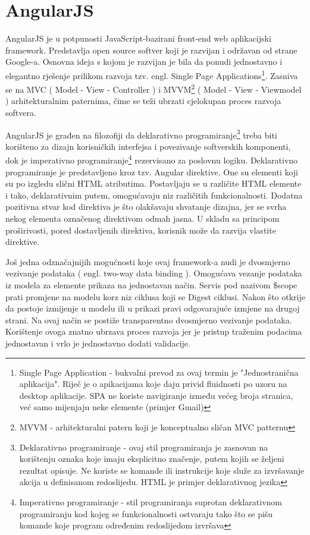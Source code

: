 \documentclass[12pt, a4paper]{report}
\theoremstyle{definition}
\begin{document}
\section{AngularJS}
AngularJS je u potpunosti JavaScript-bazirani front-end web aplikacijski framework. Predstavlja open source softver koji je razvijan i održavan od strane Google-a. Osnovna ideja s kojom je razvijan je bila da ponudi jednostavno i elegantno rješenje prilikom razvoja tzv. engl. Single Page Applications\footnote{Single Page Application - bukvalni prevod za ovaj termin je "Jednostranična aplikacija". Riječ je o apikacijama koje daju privid fluidnosti po uzoru na desktop aplikacije. SPA ne koriste navigiranje između većeg broja stranica, već samo mijenjaju neke elemente (primjer Gmail)}. Zasniva se na MVC ( Model - View - Controller ) i MVVM\footnote{MVVM - arhitekturalni patern koji je konceptualno sličan MVC patternu} 
( Model - View - Viewmodel ) arhitekturalnim paternima, čime se teži ubrzati cjelokupan proces razvoja softvera. 

AngularJS je građen na filozofiji da deklarativno programiranje\footnote{Deklarativno programiranje - ovaj stil programiranja je zasnovan na korištenju oznaka koje imaju eksplicitno značenje, putem kojih se željeni rezultat opisuje. Ne koriste se komande ili instrukcije koje služe za izvršavanje akcija u definisanom redoslijedu. HTML je primjer deklarativnog jezika} treba biti korišteno za dizajn korisničkih interfejsa i povezivanje softverskih komponenti, dok je imperativno programiranje\footnote{Imperativno programiranje - stil programiranja suprotan deklarativnom programiranju kod kojeg se funkcionalnosti ostvaraju tako što se pišu komande koje program određenim redoslijedom izvršava } rezervisano za poslovnu logiku. Deklarativno programiranje je predstavljeno kroz tzv. Angular direktive. One su elementi koji su po izgledu slični HTML atributima. Postavljaju se u različite HTML elemente i tako, deklarativnim putem, omogućavaju niz različitih funkcionalnosti. Dodatna pozitivna stvar kod direktiva je što olakšavaju shvatanje dizajna, jer se svrha nekog elementa označenog direktivom odmah jasna. U skladu sa principom proširivosti, pored dostavljenih direktiva, korisnik može da razvija vlastite direktive. 

Još jedna odznačajnijih mogućnosti koje ovaj framework-a nudi je dvosmjerno vezivanje podataka ( engl. two-way data binding ). Omogućava vezanje podataka iz modela za elemente prikaza na jednostavan način. Servis pod nazivom \$scope prati promjene na modelu korz niz ciklusa koji se Digest ciklusi. Nakon što otkrije da postoje izmijenje u modelu ili u prikazi pravi odgovarajuće izmjene na drugoj strani. Na ovaj način se postiže transparentno dvosmjerno vezivanje podataka. Korištenje ovoga znatno ubrzava proces razvoja jer je pristup traženim podacima jednostavan i vrlo je jednostavno dodati validacije. 
\end{document}

